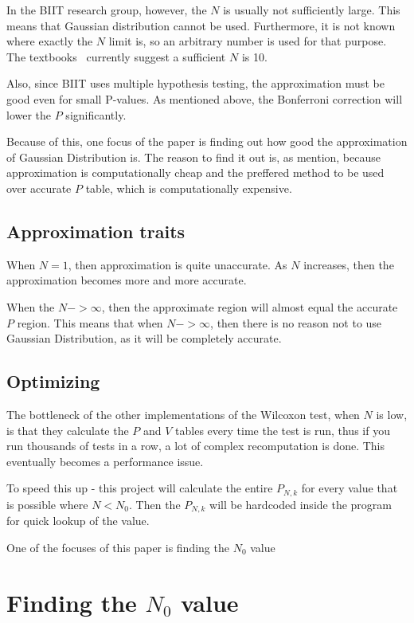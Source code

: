 \documentclass[12pt]{article}
\begin{document}
In the BIIT research group, however, the $N$ is usually not sufficiently large. This means that Gaussian distribution cannot be used. Furthermore, it is not known where exactly the $N$ limit is, so an arbitrary number is used for that purpose. The textbooks~\cite{lowry_concepts} currently suggest a sufficient $N$ is 10.

Also, since BIIT uses multiple hypothesis testing, the approximation must be good even for small P-values. As mentioned above, the Bonferroni correction will lower the $P$ significantly.

Because of this, one focus of the paper is finding out how good the approximation of Gaussian Distribution is. The reason to find it out is, as mention, because approximation is computationally cheap and the preffered method to be used over accurate $P$ table, which is computationally expensive.

\subsection{Approximation traits}
When $N = 1$, then approximation is quite unaccurate. As $N$ increases, then the approximation becomes more and more accurate.

When the $N->\infty$, then the approximate region will almost equal the accurate $P$ region. This means that when $N->\infty$, then there is no reason not to use Gaussian Distribution, as it will be completely accurate.

\subsection{Optimizing}

The bottleneck of the other implementations of the Wilcoxon test, when $N$ is low, is that they calculate the $P$ and $V$ tables every time the test is run, thus if you run thousands of tests in a row, a lot of complex recomputation is done. This eventually becomes a performance issue.

To speed this up - this project will calculate the entire $P_{N, k}$ for every value that is possible where $N < N_0$. Then the $P_{N, k}$ will be hardcoded inside the program for quick lookup of the value.

One of the focuses of this paper is finding the $N_0$ value

\newpage

\section{Finding the $N_0$ value}
\end{document}
